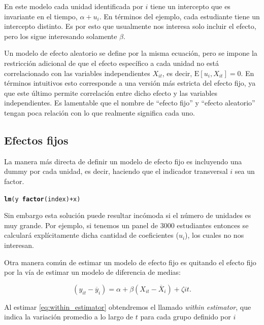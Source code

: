 \documentclass{article}\usepackage[]{graphicx}\usepackage[]{color}
\makeatletter
\newcommand{\hlopt}[1]{\textcolor[rgb]{0,0,0}{#1}}%
\newcommand{\hlstd}[1]{\textcolor[rgb]{0.345,0.345,0.345}{#1}}%
\newcommand{\hlkwd}[1]{\textcolor[rgb]{0.737,0.353,0.396}{\textbf{#1}}}%
\newenvironment{kframe}{%
 \def\at@end@of@kframe{}%
 \ifinner\ifhmode%
  \def\at@end@of@kframe{\end{minipage}}%
  \begin{minipage}{\columnwidth}%
 \fi\fi%
 \def\FrameCommand##1{\hskip\@totalleftmargin \hskip-\fboxsep
 \colorbox{shadecolor}{##1}\hskip-\fboxsep
     \hskip-\linewidth \hskip-\@totalleftmargin \hskip\columnwidth}%
 \MakeFramed {\advance\hsize-\width
   \@totalleftmargin\z@ \linewidth\hsize
   \@setminipage}}%
 {\par\unskip\endMakeFramed%
 \at@end@of@kframe}
\newenvironment{knitrout}{}{} %
\newcommand*{\eng}[1]{\textsl{#1}}
\makeatother
\begin{document}
En este modelo cada unidad identificada por $i$ tiene un intercepto que es invariante en el tiempo, $\alpha + u_i$. En términos del ejemplo, cada estudiante tiene un intercepto distinto. Es por esto que usualmente nos interesa solo incluir el efecto, pero los sigue interesando solamente $\beta$.

Un modelo de efecto aleatorio se define por la misma ecuación, pero se impone la restricción adicional de que el efecto específico a cada unidad no está correlacionado con las variables independientes $X_{it}$, es decir, $\mathrm{E}[u_i, X_{it}] = 0$. En términos intuitivos esto corresponde a una versión más estricta del efecto fijo, ya que este último permite correlación entre dicho efecto y las variables independientes. Es lamentable que el nombre de ``efecto fijo'' y ``efecto aleatorio'' tengan poca relación con lo que realmente significa cada uno.

\subsection{Efectos fijos}

La manera más directa de definir un modelo de efecto fijo es incluyendo una dummy por cada unidad, es decir, haciendo que el indicador transversal $i$ sea un factor.

\begin{knitrout}
\color{fgcolor}\begin{kframe}
\begin{alltt}
\hlkwd{lm}\hlstd{(y} \hlopt{~} \hlkwd{factor}\hlstd{(index)} \hlopt{+} \hlstd{x)}
\end{alltt}


{\ttfamily\noindent\bfseries\color{errorcolor}{\#\# Error in unique.default(x, nmax = nmax): unique() applies only to vectors}}\end{kframe}
\end{knitrout}

Sin embargo esta solución puede resultar incómoda si el número de unidades es muy grande. Por ejemplo, si tenemos un panel de 3000 estudiantes entonces se calculará explícitamente dicha cantidad de coeficientes ($u_i$), los cuales no nos interesan.

Otra manera común de estimar un modelo de efecto fijo es quitando el efecto fijo por la vía de estimar un modelo de diferencia de medias:

\begin{equation}
(y_{it} - \overline{y}_i) = \alpha + \beta (X_{it} - \overline{X}_i)  + \zeta{it}.
\label{eq:within_estimator}
\end{equation}

Al estimar \eqref{eq:within_estimator} obtendremos el llamado \eng{within estimator}, que indica la variación promedio a lo largo de $t$ para cada grupo definido por $i$
 
\end{document}
